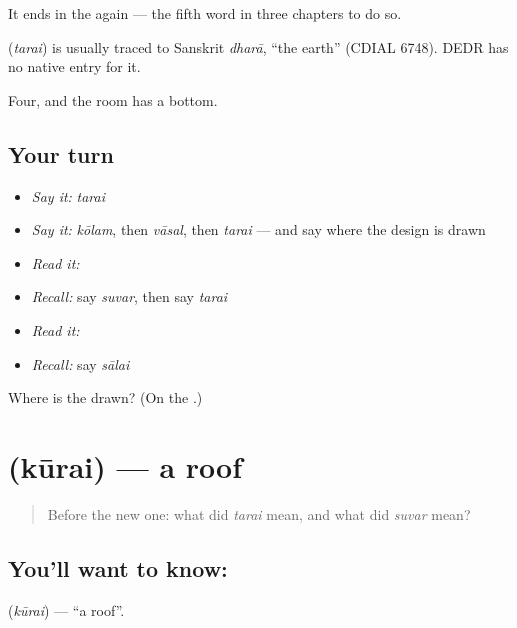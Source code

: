 It ends in the \textbf{} again — the fifth word in three chapters to do so.

\begin{cousinweb}
\textbf{} (\emph{tarai}) is usually traced to Sanskrit \emph{dharā}, \textquotedblleft{}the earth\textquotedblright{} (CDIAL 6748). DEDR has no native entry for it.
\end{cousinweb}

\begin{grammarlens}[title={What you've built}]
Four, and the room has a bottom.
\end{grammarlens}

\subsection*{Your turn}
\begin{itemize}
\raggedright
  \item \emph{Say it:} \emph{tarai}
  \item \emph{Say it:} \emph{kōlam}, then \emph{vāsal}, then \emph{tarai} — and say where the design is drawn
  \item \emph{Read it:} \textbf{}
  \item \emph{Recall:} say \emph{suvar}, then say \emph{tarai}
  \item \emph{Read it:} \textbf{}
  \item \emph{Recall:} say \emph{sālai}
\end{itemize}

\begin{tcolorbox}[breakable,colback=teal!4,colframe=teal!35!black,title={Before you move on}]
Where is the  drawn? (On the \textbf{}.)
\end{tcolorbox}
\section[\texorpdfstring{\ta{கூரை} (kūrai)}{கூரை (kūrai)}]{ (kūrai) — a roof}

\label{lesson:TA-C70-roof}



\begin{quote}
Before the new one: what did \emph{tarai} mean, and what did \emph{suvar} mean?
\end{quote}

\subsection*{You'll want to know: }
\textbf{} (\emph{kūrai}) — \textquotedblleft{}a roof\textquotedblright{}.

